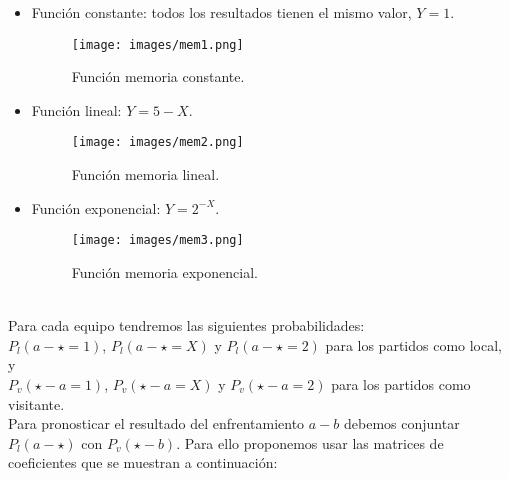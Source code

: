 \newpage

\begin{itemize}
	\item Función constante: todos los resultados tienen el mismo valor, $Y=1$.
	\begin{figure}[H]
		\centering
		\texttt{[image: images/mem1.png]}
		\caption{Función memoria constante.} \label{fig:constante}
	\end{figure}
	
	\item Función lineal: $Y=5-X$.
	\begin{figure}[H]
		\centering
		\texttt{[image: images/mem2.png]}
		\caption{Función memoria lineal.} \label{fig:lineal}
	\end{figure}

\newpage

	\item Función exponencial: $Y=2^{-X}$.
	\begin{figure}[H]
		\centering
		\texttt{[image: images/mem3.png]}
		\caption{Función memoria exponencial.} \label{fig:exponencial}
	\end{figure}	
\end{itemize}
\ \\
Para cada equipo tendremos las siguientes probabilidades:\\
$P_{l}(a - \star=1)$, $P_{l}(a - \star=X)$ y $P_{l}(a - \star=2)$ para los partidos como local, y \\
$P_{v}(\star - a=1)$, $P_{v}(\star - a=X)$ y $P_{v}(\star - a=2)$ para los partidos como visitante.\\

Para pronosticar el resultado del enfrentamiento $a-b$ debemos conjuntar $P_{l}(a - \star)$ con $P_{v}(\star - b)$. Para ello proponemos usar las matrices de coeficientes que se muestran a continuación:


